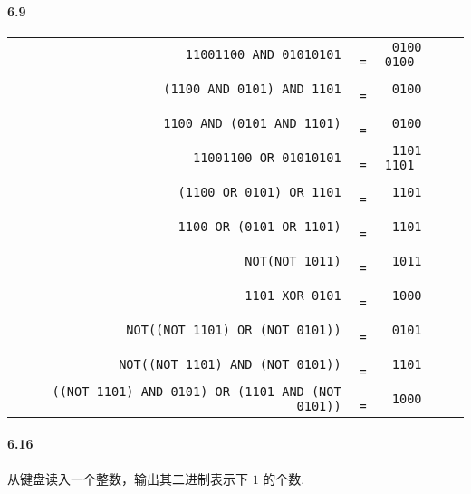 \documentclass[UTF8]{ctexart}
\begin{document}
    \pagestyle{main}
    \paragraph{6.9}
    \begin{center}
        \renewcommand\arraystretch{1.5}
        \begin{tabular}{r@{}c@{}l@{}}
            \texttt{11001100 AND 01010101}&\texttt { =}&\texttt{ 0100 0100}\\
            \texttt{(1100 AND 0101) AND 1101}&\texttt { =}&\texttt{ 0100}\\
            \texttt{1100 AND (0101 AND 1101)}&\texttt { =}&\texttt{ 0100}\\
            \texttt{11001100 OR 01010101}&\texttt { =}&\texttt{ 1101 1101}\\
            \texttt{(1100 OR 0101) OR 1101}&\texttt { =}&\texttt{ 1101}\\
            \texttt{1100 OR (0101 OR 1101)}&\texttt { =}&\texttt{ 1101}\\
            \texttt{NOT(NOT 1011)}&\texttt { =}&\texttt{ 1011}\\
            \texttt{1101 XOR 0101}&\texttt { =}&\texttt{ 1000}\\
            \texttt{NOT((NOT 1101) OR (NOT 0101))}&\texttt { =}&\texttt{ 0101}\\
            \texttt{NOT((NOT 1101) AND (NOT 0101))}&\texttt { =}&\texttt{ 1101}\\
            \texttt{((NOT 1101) AND 0101) OR (1101 AND (NOT 0101))}&\texttt { =}&\texttt{ 1000}\\
        \end{tabular}
    \end{center}
    \paragraph{6.16} 从键盘读入一个整数，输出其二进制表示下 $1$ 的个数.
\end{document}

